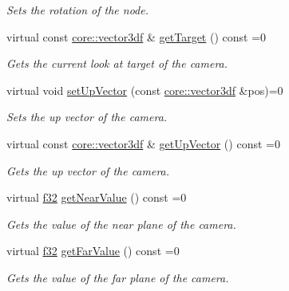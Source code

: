 \begin{DoxyCompactItemize}
\begin{DoxyCompactList}\small\item\em Sets the rotation of the node. \end{DoxyCompactList}\item 
virtual const \hyperlink{namespaceirr_1_1core_ae6e2b2a6c552833ebbd5b7463d03586b}{core\+::vector3df} \& \hyperlink{classirr_1_1scene_1_1ICameraSceneNode_a3ce50433986650eea15b20e4ed19c952}{get\+Target} () const =0
\begin{DoxyCompactList}\small\item\em Gets the current look at target of the camera. \end{DoxyCompactList}\item 
virtual void \hyperlink{classirr_1_1scene_1_1ICameraSceneNode_a1e74c17d89979fde4738276ccdcc0d3a}{set\+Up\+Vector} (const \hyperlink{namespaceirr_1_1core_ae6e2b2a6c552833ebbd5b7463d03586b}{core\+::vector3df} \&pos)=0
\begin{DoxyCompactList}\small\item\em Sets the up vector of the camera. \end{DoxyCompactList}\item 
virtual const \hyperlink{namespaceirr_1_1core_ae6e2b2a6c552833ebbd5b7463d03586b}{core\+::vector3df} \& \hyperlink{classirr_1_1scene_1_1ICameraSceneNode_a0dfb97859302021b9a44f2ead59fa230}{get\+Up\+Vector} () const =0
\begin{DoxyCompactList}\small\item\em Gets the up vector of the camera. \end{DoxyCompactList}\item 
virtual \hyperlink{namespaceirr_a0277be98d67dc26ff93b1a6a1d086b07}{f32} \hyperlink{classirr_1_1scene_1_1ICameraSceneNode_aee5dfccee2ec0b0cbcdb1079a6430a25}{get\+Near\+Value} () const =0
\begin{DoxyCompactList}\small\item\em Gets the value of the near plane of the camera. \end{DoxyCompactList}\item 
virtual \hyperlink{namespaceirr_a0277be98d67dc26ff93b1a6a1d086b07}{f32} \hyperlink{classirr_1_1scene_1_1ICameraSceneNode_a7a6603b808522605276359b834d48245}{get\+Far\+Value} () const =0
\begin{DoxyCompactList}\small\item\em Gets the value of the far plane of the camera. \end{DoxyCompactList}\item 

\end{DoxyCompactItemize}
